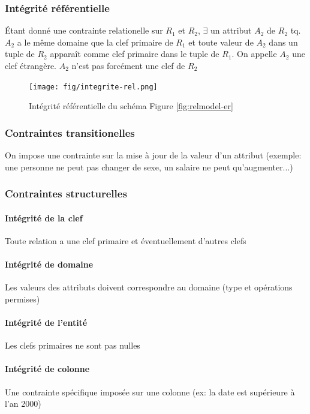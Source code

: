 \documentclass[a4paper]{article}
\begin{document}
\subsubsection{Intégrité référentielle}
\'Etant donné une contrainte relationelle sur $R_1$ et $R_2$, $\exists$ un attribut
$A_2$ de $R_2$ tq. $A_2$ a le même domaine que la clef primaire de $R_1$ et toute
valeur de $A_2$ dans un tuple de $R_2$ apparaît comme clef primaire dans le tuple
de $R_1$. On appelle $A_2$ une clef étrangère. $A_2$ n'est pas forcément une clef
de $R_2$

\begin{figure}[H]
    \center
    \texttt{[image: fig/integrite-rel.png]}
    \caption{Intégrité référentielle du schéma Figure \ref{fig:relmodel-er}}
\end{figure}

\subsubsection{Contraintes transitionelles}
On impose une contrainte sur la mise à jour de la valeur d'un attribut (exemple:
une personne ne peut pas changer de sexe, un salaire ne peut qu'augmenter...)

\subsubsection{Contraintes structurelles}
\paragraph{Intégrité de la clef}
Toute relation a une clef primaire et éventuellement d'autres clefs

\paragraph{Intégrité de domaine}
Les valeurs des attributs doivent correspondre au domaine (type et opérations permises)

\paragraph{Intégrité de l'entité}
Les clefs primaires ne sont pas nulles

\paragraph{Intégrité de colonne}
Une contrainte spécifique imposée sur une colonne (ex: la date est supérieure à l'an 2000)
\end{document}
